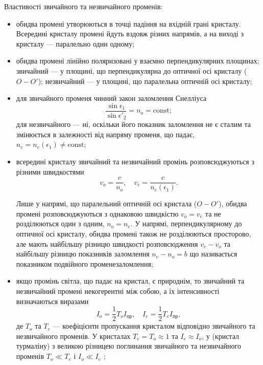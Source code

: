 \bigskip

Властивості звичайного та незвичайного променів:

\medskip

\begin{itemize}
\item обидва промені утворюються в точці падіння на вхідній грані
кристалу. Всередині кристалу промені йдуть вздовж різних напрямів,
а на виході з кристалу --- паралельно один одному;
\item обидва промені лінійно поляризовані у взаємно перпендикулярних
площинах; звичайний --- у площині, що перпендикулярна до оптичної
осі кристалу ($ O-O' $); незвичайний --- у площині, що паралельна
оптичній осі кристалу;
\item для звичайного променя чинний закон заломлення Снелліуса
\begin{equation*}
    \frac{\sin\epsilon_1}{\sin\epsilon'_2} = n_o = \mathrm{const};
\end{equation*} для незвичайного --- ні, оскільки його
показник заломлення не є сталим та змінюється в залежності від
напряму променя, що падає, $n_e = n_e (\epsilon_1) \neq \mathrm{const}$;
\item всередині кристалу звичайний та незвичайний промінь
розповсюджуються з різними швидкостями
\begin{equation*}
 v_o = \frac{c}{n_o}, \quad v_e = \frac{c}{n_e(\epsilon_1)}.
\end{equation*}

Лише у напрямі, що паралельний оптичній осі
кристала ($O-O'$), обидва промені розповсюджуються з однаковою
швидкістю $v_o = v_e$ та не розділюються один з одним, $n_o = n_e$. У
напрямі, перпендикулярному до оптичної осі кристалу, обидва
промені також не розділюються просторово, але мають найбільшу
різницю швидкості розповсюдження $v_e - v_o$ та найбільшу різницю
показників заломлення $n_e - n_o = b$ що називається показником
подвійного променезаломлення;

\item якщо промінь світла, що падає на кристал, є природнім, то звичайний
та незвичайний промені некогерентні між собою, а їх інтенсивності
визначаються виразами
\begin{equation*}
    I_o = \frac12 T_o I_\text{пр}, \quad I_e = \frac12 T_e I_\text{пр},
\end{equation*}
де $ T_o $ та $ T_e $ --- коефіцієнти пропускання кристалом відповідно звичайного та незвичайного променів. У  кристалах $T_e = T_o \approx 1$ та $ I_e \approx I_o $, у  (кристал
турмаліну) з великою різницею поглинання звичайного та незвичайного
променів $ T_o \ll T_e $ і  $ I_o \ll I_e $ ;


\end{itemize}
